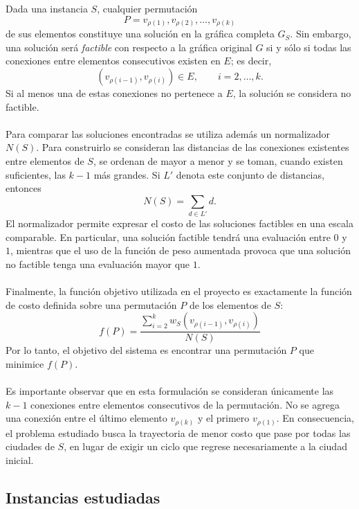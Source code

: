 \documentclass[12pt]{article}
\begin{document}
\\\\
Dada una instancia \(S\), cualquier permutación
\[
    P=
    v_{\rho(1)},
    v_{\rho(2)},
    \ldots,
    v_{\rho(k)}
\]
de sus elementos constituye una solución en la gráfica completa \(G_S\).
Sin embargo, una solución será \emph{factible} con respecto a la gráfica
original \(G\) si y sólo si todas las conexiones entre elementos
consecutivos existen en \(E\); es decir,
\[
    \left(
        v_{\rho(i-1)},
        v_{\rho(i)}
    \right)
    \in E,
    \qquad
    i=2,\ldots,k.
\]
Si al menos una de estas conexiones no pertenece a \(E\), la solución se
considera no factible.
\\\\
Para comparar las soluciones encontradas se utiliza además un normalizador
\(N(S)\). Para construirlo se consideran las distancias de las conexiones
existentes entre elementos de \(S\), se ordenan de mayor a menor y se toman,
cuando existen suficientes, las \(k-1\) más grandes. Si \(L'\) denota este
conjunto de distancias, entonces
\[
    N(S)
    =
    \sum_{d\in L'} d.
\]
El normalizador permite expresar el costo de las soluciones factibles en una
escala comparable. En particular, una solución factible tendrá una
evaluación entre \(0\) y \(1\), mientras que el uso de la función de peso
aumentada provoca que una solución no factible tenga una evaluación mayor
que \(1\).
\\\\
Finalmente, la función objetivo utilizada en el proyecto es exactamente la
función de costo definida sobre una permutación \(P\) de los elementos de
\(S\):
\[
    \boxed{
    f(P)
    =
    \frac{
        \displaystyle
        \sum_{i=2}^{k}
        w_S
        \left(
            v_{\rho(i-1)},
            v_{\rho(i)}
        \right)
    }{
        N(S)
    }
    }
\]
Por lo tanto, el objetivo del sistema es encontrar una permutación
\(P\) que minimice \(f(P)\).
\\\\
Es importante observar que en esta formulación se consideran únicamente las
\(k-1\) conexiones entre elementos consecutivos de la permutación. No se
agrega una conexión entre el último elemento
\(v_{\rho(k)}\) y el primero \(v_{\rho(1)}\). En consecuencia, el problema
estudiado busca la trayectoria de menor costo que pase por todas las
ciudades de \(S\), en lugar de exigir un ciclo que regrese necesariamente
a la ciudad inicial.

\subsection{Instancias estudiadas}
\end{document}
